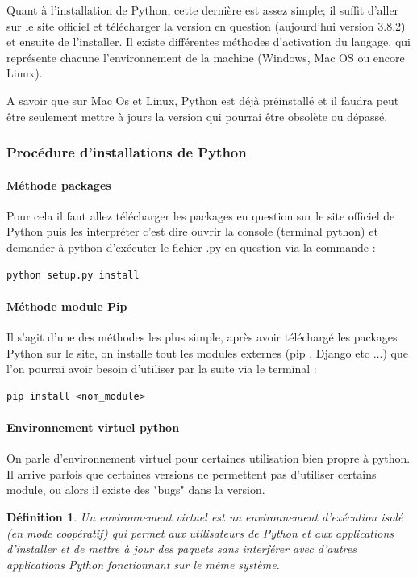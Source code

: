 \documentclass[a4paper, 12pt, twoside]{article}
\newtheorem{definition}{Définition}
\begin{document}
Quant à l'installation de Python, cette dernière est assez simple; il suffit d'aller sur le site officiel et télécharger la version en question (aujourd'hui version 3.8.2) et ensuite de l'installer. Il existe différentes méthodes d'activation du langage, qui représente chacune l'environnement de la machine (Windows, Mac OS ou encore Linux).\newline

A savoir que sur Mac Os et Linux, Python est déjà préinstallé et il faudra peut être seulement mettre à jours la version qui pourrai être obsolète ou dépassé.

\subsubsection{Procédure d'installations de Python} 
\paragraph{Méthode packages}{Pour cela il faut allez télécharger les packages en question sur le site officiel de Python puis les interpréter c'est dire ouvrir la console (terminal python) et demander à python d'exécuter le fichier \textsf{.py} en question via la commande :}
\begin{verbatim}
python setup.py install
\end{verbatim} 

\paragraph{Méthode module Pip} {Il s'agit d'une des méthodes les plus simple, après avoir téléchargé les packages Python sur le site, on installe tout les modules externes (pip , Django etc ...)  que l'on pourrai avoir besoin d'utiliser par la suite via le terminal : }
\begin{verbatim}
pip install <nom_module>
\end{verbatim}

\paragraph{Environnement virtuel python}{On parle d'environnement virtuel pour certaines utilisation bien propre à \textsf{python}. Il arrive parfois que certaines versions ne permettent pas d'utiliser certains module, ou alors il existe des "bugs" dans la version.}
\begin{definition}
Un environnement virtuel est un environnement d'exécution isolé (en mode coopératif) qui permet aux utilisateurs de Python et aux applications d'installer et de mettre à jour des paquets sans interférer avec d'autres applications Python fonctionnant sur le même système.
\end{definition}
\end{document}
